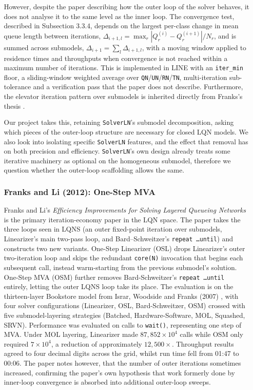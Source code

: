 However, despite the paper describing how the outer loop of the solver behaves, it does not analyse it to the same level as the inner loop. The convergence test, described in Subsection 3.3.4, depends on the largest per-class change in mean queue length between iterations, $\Delta_{i+1,l} = \max_r |Q_r^{(i)} - Q_r^{(i+1)}| / N_r$, and is summed across submodels, $\Delta_{i+1} = \sum_l \Delta_{i+1,l}$, with a moving window applied to residence times and throughputs when convergence is not reached within a maximum number of iterations. This is implemented in LINE with an \texttt{iter\_min} floor, a sliding-window weighted average over  \texttt{QN}/\texttt{UN}/\texttt{RN}/\texttt{TN}, multi-iteration sub-tolerance and a verification pass that the paper does not describe. Furthermore, the elevator iteration pattern over submodels is inherited directly from Franks's thesis \cite{franks99}.

Our project takes this, retaining \texttt{SolverLN}'s submodel decomposition, asking which pieces of the outer-loop structure are necessary for closed LQN models. We also look into isolating specific \texttt{SolverLN} features, and the effect that removal has on both precision and efficiency. \texttt{SolverLN}'s own design already treats some iterative machinery as optional on the homogeneous submodel, therefore we question whether the outer-loop scaffolding allows the same.

\subsubsection*{Franks and Li (2012): One-Step MVA}

Franks and Li's \textit{Efficiency Improvements for Solving Layered Queueing Networks} \cite{franksli2012} is the primary iteration-economy paper in the LQN space. The paper takes the three loops seen in LQNS (an outer fixed-point iteration over submodels, Linearizer's main two-pass loop, and Bard--Schweitzer's \texttt{repeat \dots until}) and constructs two new variants. One-Step Linearizer (OSL) drops Linearizer's outer two-iteration loop and skips the redundant \texttt{core(N)} invocation that begins each subsequent call, instead warm-starting from the previous submodel's solution. One-Step MVA (OSM) further removes Bard-Schweitzer's \texttt{repeat \dots until} entirely, letting the outer LQNS loop take its place. The evaluation is on the thirteen-layer Bookstore model from Israr, Woodside and Franks (2007) \cite{israr2007}, with four solver configurations (Linearizer, OSL, Bard-Schweitzer, OSM) crossed with five submodel-layering strategies (Batched, Hardware-Software, MOL, Squashed, SRVN). Performance was evaluated on calls to \texttt{wait()}, representing one step of MVA. Under MOL layering, Linearizer made $87{,}852 \times 10^4$ calls while OSM only required $7 \times 10^4$, a reduction of approximately $12{,}500\times$. Throughput results agreed to four decimal digits across the grid, whilst run time fell from 01:47 to 00:06. The paper notes however, that the number of outer iterations sometimes increased, confirming the paper's own hypothesis that work formerly done by inner-loop convergence is absorbed into additional outer-loop sweeps.

